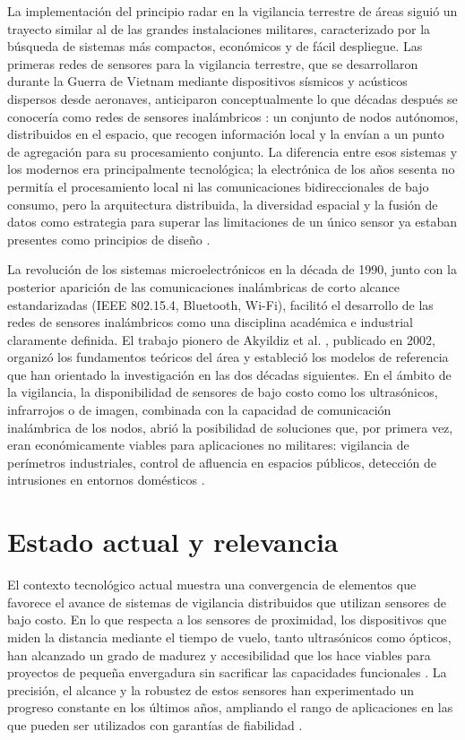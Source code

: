 La implementación del principio radar en la vigilancia terrestre de áreas siguió un trayecto similar al de las grandes instalaciones militares, caracterizado por la búsqueda de sistemas más compactos, económicos y de fácil despliegue. Las primeras redes de sensores para la vigilancia terrestre, que se desarrollaron durante la Guerra de Vietnam mediante dispositivos sísmicos y acústicos dispersos desde aeronaves, anticiparon conceptualmente lo que décadas después se conocería como redes de sensores inalámbricos \cite{12,13}: un conjunto de nodos autónomos, distribuidos en el espacio, que recogen información local y la envían a un punto de agregación para su procesamiento conjunto. La diferencia entre esos sistemas y los modernos era principalmente tecnológica; la electrónica de los años sesenta no permitía el procesamiento local ni las comunicaciones bidireccionales de bajo consumo, pero la arquitectura distribuida, la diversidad espacial y la fusión de datos como estrategia para superar las limitaciones de un único sensor ya estaban presentes como principios de diseño \cite{13}.

La revolución de los sistemas microelectrónicos en la década de 1990, junto con la posterior aparición de las comunicaciones inalámbricas de corto alcance estandarizadas (IEEE 802.15.4, Bluetooth, Wi-Fi), facilitó el desarrollo de las redes de sensores inalámbricos como una disciplina académica e industrial claramente definida. El trabajo pionero de Akyildiz et al. \cite{1}, publicado en 2002, organizó los fundamentos teóricos del área y estableció los modelos de referencia que han orientado la investigación en las dos décadas siguientes. En el ámbito de la vigilancia, la disponibilidad de sensores de bajo costo como los ultrasónicos, infrarrojos o de imagen, combinada con la capacidad de comunicación inalámbrica de los nodos, abrió la posibilidad de soluciones que, por primera vez, eran económicamente viables para aplicaciones no militares: vigilancia de perímetros industriales, control de afluencia en espacios públicos, detección de intrusiones en entornos domésticos \cite{3,4,18}.

\section{Estado actual y relevancia}

El contexto tecnológico actual muestra una convergencia de elementos que favorece el avance de sistemas de vigilancia distribuidos que utilizan sensores de bajo costo. En lo que respecta a los sensores de proximidad, los dispositivos que miden la distancia mediante el tiempo de vuelo, tanto ultrasónicos como ópticos, han alcanzado un grado de madurez y accesibilidad que los hace viables para proyectos de pequeña envergadura sin sacrificar las capacidades funcionales \cite{9,10}. La precisión, el alcance y la robustez de estos sensores han experimentado un progreso constante en los últimos años, ampliando el rango de aplicaciones en las que pueden ser utilizados con garantías de fiabilidad \cite{11}.

